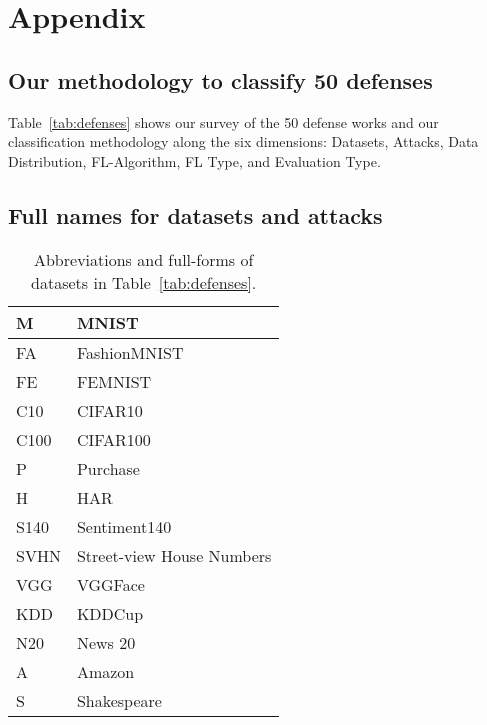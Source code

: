 
\appendix
\section{Appendix}\label{sec:appendix}

\subsection{Our methodology to classify 50 defenses}\label{appdx:classification_method}
Table~\ref{tab:defenses} shows our survey of the 50 defense works and our classification methodology along the six dimensions: Datasets, Attacks, Data Distribution, FL-Algorithm, FL Type, and Evaluation Type.


\subsection{Full names for datasets and attacks}\label{appdx:abbreviations}

\begin{table}[t]
\centering
\scriptsize
\caption{Abbreviations and full-forms of datasets in Table~\ref{tab:defenses}.}
\label{tab:full_names_datasets}
\begin{tabular}{|l|l|}
\hline
M    & MNIST                     \\ \hline
FA   & FashionMNIST              \\ \hline
FE   & FEMNIST                   \\ \hline
C10  & CIFAR10                   \\ \hline
C100 & CIFAR100                  \\ \hline
P    & Purchase                  \\ \hline
H    & HAR                       \\ \hline
S140 & Sentiment140              \\ \hline
SVHN & Street-view House Numbers \\ \hline
VGG  & VGGFace                   \\ \hline
KDD  & KDDCup                    \\ \hline
N20  & News 20                   \\ \hline
A    & Amazon                    \\ \hline
S    & Shakespeare               \\ \hline
\end{tabular}
\end{table}

